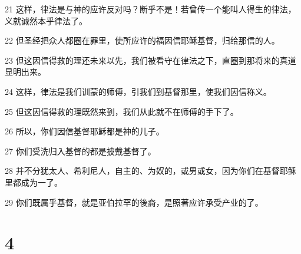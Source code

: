 \par 21 这样，律法是与神的应许反对吗？断乎不是！若曾传一个能叫人得生的律法，义就诚然本乎律法了。
\par 22 但圣经把众人都圈在罪里，使所应许的福因信耶稣基督，归给那信的人。
\par 23 但这因信得救的理还未来以先，我们被看守在律法之下，直圈到那将来的真道显明出来。
\par 24 这样，律法是我们训蒙的师傅，引我们到基督那里，使我们因信称义。
\par 25 但这因信得救的理既然来到，我们从此就不在师傅的手下了。
\par 26 所以，你们因信基督耶稣都是神的儿子。
\par 27 你们受洗归入基督的都是披戴基督了。
\par 28 并不分犹太人、希利尼人，自主的、为奴的，或男或女，因为你们在基督耶稣里都成为一了。
\par 29 你们既属乎基督，就是亚伯拉罕的後裔，是照著应许承受产业的了。

\chapter{4}

